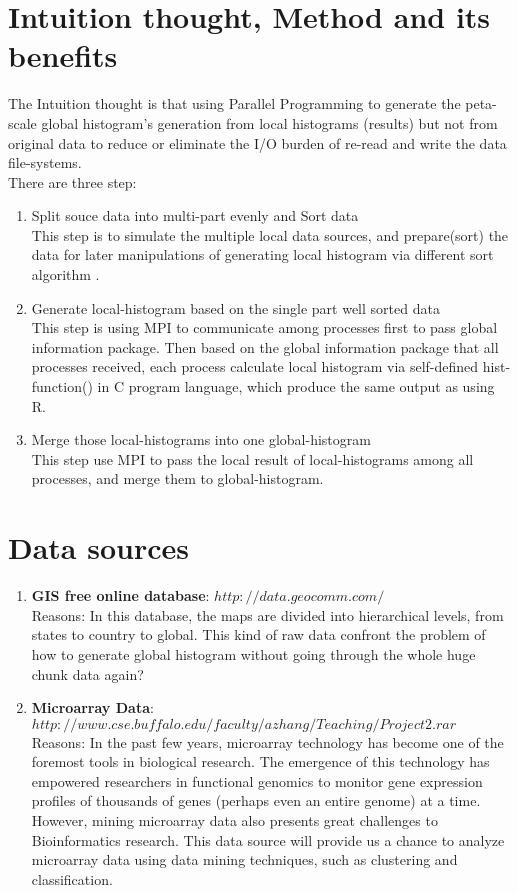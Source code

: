\documentclass[11pt]{article}
\begin{document}
\section{Intuition thought, Method and its benefits}
The Intuition thought is that using Parallel Programming to generate the peta-scale global histogram's generation from local histograms (results) but not from original data to reduce or eliminate the I/O burden of re-read and write the data  file-systems.\\
There are three step: 
\begin{enumerate}
\item{Split souce data into multi-part evenly and Sort data}\\
This step is to simulate the multiple local data sources, and prepare(sort) the data for later manipulations of generating local histogram via different sort algorithm .
\item{Generate local-histogram based on the single part well sorted data}\\
This step is using MPI to communicate among processes first to pass global information package. Then based on the global information package that all processes received, each process calculate local histogram via self-defined hist-function() in C program language, which produce the same output as using R.
\item{Merge those local-histograms into one global-histogram}\\
This step use MPI to pass the local result of local-histograms among all processes, and merge them to global-histogram.
\end{enumerate}


\section{Data sources}
\begin{enumerate}
\item \textbf{GIS free online database}: $http://data.geocomm.com/$  \\
Reasons: In this database, the maps are divided into hierarchical levels, from states to  country to global. This kind of raw data confront the problem of how to generate global histogram without going through the whole huge chunk data again?
\item \textbf{Microarray Data}: $http://www.cse.buffalo.edu/faculty/azhang/Teaching/Project2.rar$ \\
Reasons: In the past few years, microarray technology has become one of the foremost tools in biological research. The emergence of this technology has empowered researchers in functional genomics to monitor gene expression profiles of thousands of genes (perhaps even an entire genome) at a time. However, mining microarray data also presents great challenges to Bioinformatics research. This data source will provide us a chance to analyze microarray data using data mining techniques, such as clustering and classification.
\end{enumerate}




\nocite{*}

\begin{spacing}{1}
  
  
\end{spacing}
\end{document}
